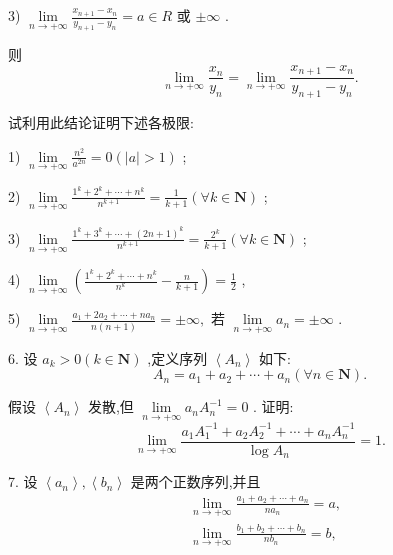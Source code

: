 3) $\mathop{\lim }\limits_{{n \rightarrow   + \infty }}\frac{{x}_{n + 1} - {x}_{n}}{{y}_{n + 1} - {y}_{n}} = a \in  R$ 或 $\pm  \infty$ .

则
$$\mathop{\lim }\limits_{{n \rightarrow   + \infty }}\frac{{x}_{n}}{{y}_{n}} = \mathop{\lim }\limits_{{n \rightarrow   + \infty }}\frac{{x}_{n + 1} - {x}_{n}}{{y}_{n + 1} - {y}_{n}}.$$

试利用此结论证明下述各极限:

1) $\mathop{\lim }\limits_{{n \rightarrow   + \infty }}\frac{{n}^{2}}{{a}^{2n}} = 0\left( {\left| a\right|  > 1}\right)$ ;

2) $\mathop{\lim }\limits_{{n \rightarrow   + \infty }}\frac{{1}^{k} + {2}^{k} + \cdots  + {n}^{k}}{{n}^{k + 1}} = \frac{1}{k + 1}\left( {\forall k \in  \mathbf{N}}\right)$ ;

3) $\mathop{\lim }\limits_{{n \rightarrow   + \infty }}\frac{{1}^{k} + {3}^{k} + \cdots  + {\left( 2n + 1\right) }^{k}}{{n}^{k + 1}} = \frac{{2}^{k}}{k + 1}\left( {\forall k \in  \mathbf{N}}\right)$ ;

4) $\mathop{\lim }\limits_{{n \rightarrow   + \infty }}\left( {\frac{{1}^{k} + {2}^{k} + \cdots  + {n}^{k}}{{n}^{k}} - \frac{n}{k + 1}}\right)  = \frac{1}{2}$ ,

5) $\mathop{\lim }\limits_{{n \rightarrow   + \infty }}\frac{{a}_{1} + 2{a}_{2} + \cdots  + n{a}_{n}}{n\left( {n + 1}\right) } =  \pm  \infty ,$ 若 $\mathop{\lim }\limits_{{n \rightarrow   + \infty }}{a}_{n} =  \pm  \infty$ .

6. 设 ${a}_{k} > 0\left( {k \in  \mathbf{N}}\right)$ ,定义序列 $\left\langle  {A}_{n}\right\rangle$ 如下:
$${A}_{n} = {a}_{1} + {a}_{2} + \cdots  + {a}_{n}\left( {\forall n \in  \mathbf{N}}\right) .$$

假设 $\left\langle  {A}_{n}\right\rangle$ 发散,但 $\mathop{\lim }\limits_{{n \rightarrow   + \infty }}{a}_{n}{A}_{n}^{-1} = 0$ . 证明:
$$\mathop{\lim }\limits_{{n \rightarrow   + \infty }}\frac{{a}_{1}{A}_{1}^{-1} + {a}_{2}{A}_{2}^{-1} + \cdots  + {a}_{n}{A}_{n}^{-1}}{\log {A}_{n}} = 1.$$

7. 设 $\left\langle  {a}_{n}\right\rangle  ,\left\langle  {b}_{n}\right\rangle$ 是两个正数序列,并且
\begin{align*}
	&\mathop{\lim }\limits_{{n \rightarrow   + \infty }}\frac{{a}_{1} + {a}_{2} + \cdots  + {a}_{n}}{n{a}_{n}} = a,\\
	&\mathop{\lim }\limits_{{n \rightarrow   + \infty }}\frac{{b}_{1} + {b}_{2} + \cdots  + {b}_{n}}{n{b}_{n}} = b,
\end{align*}


